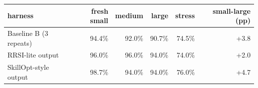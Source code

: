 \begin{tabular}{lrrrrr}
\toprule
harness & fresh small & medium & large & stress & small-large (pp) \\
\midrule
Baseline B (3 repeats) & 94.4\% & 92.0\% & 90.7\% & 74.5\% & +3.8 \\
RRSI-lite output & 96.0\% & 96.0\% & 94.0\% & 74.0\% & +2.0 \\
SkillOpt-style output & 98.7\% & 94.0\% & 94.0\% & 76.0\% & +4.7 \\
\bottomrule
\end{tabular}
